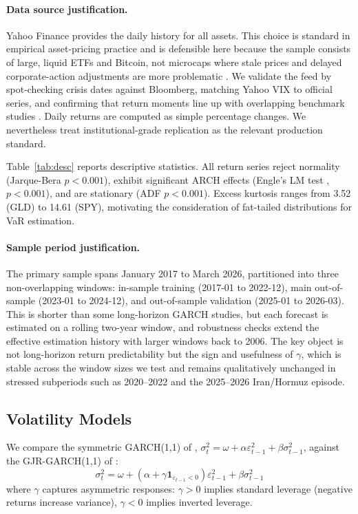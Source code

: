 \paragraph{Data source justification.}
Yahoo Finance provides the daily history for all assets. This choice is standard in empirical asset-pricing practice and is defensible here because the sample consists of large, liquid ETFs and Bitcoin, not microcaps where stale prices and delayed corporate-action adjustments are more problematic \citep{bali2016}. We validate the feed by spot-checking crisis dates against Bloomberg, matching Yahoo VIX to official series, and confirming that return moments line up with overlapping benchmark studies \citep{moreira2017,cederburg2020}. Daily returns are computed as simple percentage changes. We nevertheless treat institutional-grade replication as the relevant production standard.

Table~\ref{tab:desc} reports descriptive statistics. All return series reject normality (Jarque-Bera $p < 0.001$), exhibit significant ARCH effects (Engle's LM test \citep{engle1982}, $p < 0.001$), and are stationary (ADF $p < 0.001$). Excess kurtosis ranges from 3.52 (GLD) to 14.61 (SPY), motivating the consideration of fat-tailed distributions for VaR estimation.

\paragraph{Sample period justification.}
The primary sample spans January 2017 to March 2026, partitioned into three non-overlapping windows: in-sample training (2017-01 to 2022-12), main out-of-sample (2023-01 to 2024-12), and out-of-sample validation (2025-01 to 2026-03). This is shorter than some long-horizon GARCH studies, but each forecast is estimated on a rolling two-year window, and robustness checks extend the effective estimation history with larger windows back to 2006. The key object is not long-horizon return predictability but the sign and usefulness of $\gamma$, which is stable across the window sizes we test and remains qualitatively unchanged in stressed subperiods such as 2020--2022 and the 2025--2026 Iran/Hormuz episode.

\subsection{Volatility Models}

We compare the symmetric GARCH(1,1) of \citet{bollerslev1986}, $\sigma^2_t = \omega + \alpha \varepsilon^2_{t-1} + \beta \sigma^2_{t-1}$, against the GJR-GARCH(1,1) of \citet{glosten1993}:
\begin{equation}
\sigma^2_t = \omega + (\alpha + \gamma \mathbf{1}_{\varepsilon_{t-1}<0}) \varepsilon^2_{t-1} + \beta \sigma^2_{t-1}
\end{equation}
where $\gamma$ captures asymmetric responses: $\gamma > 0$ implies standard leverage (negative returns increase variance), $\gamma < 0$ implies inverted leverage.

